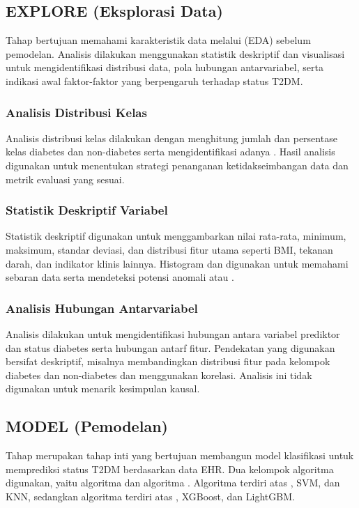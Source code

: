 \subsection{EXPLORE (Eksplorasi Data)}
Tahap  bertujuan memahami karakteristik data melalui  (EDA) sebelum pemodelan. Analisis dilakukan menggunakan statistik deskriptif dan visualisasi untuk mengidentifikasi distribusi data, pola hubungan antarvariabel, serta indikasi awal faktor-faktor yang berpengaruh terhadap status T2DM.

\subsubsection{Analisis Distribusi Kelas}
Analisis distribusi kelas dilakukan dengan menghitung jumlah dan persentase kelas diabetes dan non-diabetes serta mengidentifikasi adanya . Hasil analisis digunakan untuk menentukan strategi penanganan ketidakseimbangan data dan metrik evaluasi yang sesuai.

\subsubsection{Statistik Deskriptif Variabel}
Statistik deskriptif digunakan untuk menggambarkan nilai rata-rata, minimum, maksimum, standar deviasi, dan distribusi fitur utama seperti BMI, tekanan darah, dan indikator klinis lainnya. Histogram dan  digunakan untuk memahami sebaran data serta mendeteksi potensi anomali atau .

\subsubsection{Analisis Hubungan Antarvariabel}
Analisis dilakukan untuk mengidentifikasi hubungan antara variabel prediktor dan status diabetes serta hubungan antarf fitur. Pendekatan yang digunakan bersifat deskriptif, misalnya membandingkan distribusi fitur pada kelompok diabetes dan non-diabetes dan menggunakan  korelasi. Analisis ini tidak digunakan untuk menarik kesimpulan kausal.

\subsection{MODEL (Pemodelan)}
Tahap  merupakan tahap inti yang bertujuan membangun model klasifikasi untuk memprediksi status T2DM berdasarkan data EHR. Dua kelompok algoritma digunakan, yaitu algoritma  dan algoritma . Algoritma  terdiri atas , SVM, dan KNN, sedangkan algoritma  terdiri atas , XGBoost, dan LightGBM.

